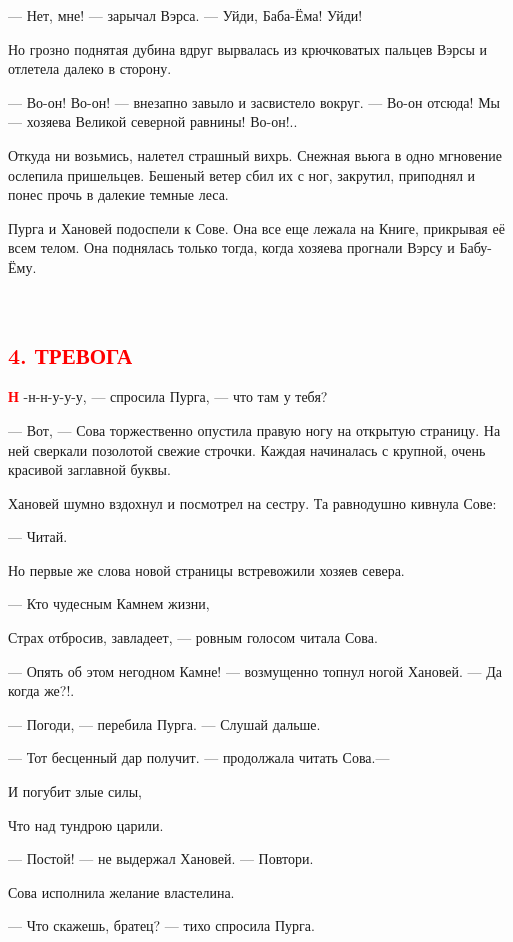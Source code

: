 \documentclass[oneside,final,14pt]{extreport}
\begin{document}
	— Нет, мне! — зарычал Вэрса. — Уйди, Баба-Ёма! Уйди!
	
	Но грозно поднятая дубина вдруг вырвалась из крючковатых пальцев Вэрсы и отлетела далеко в сторону.
	
	— Во-он! Во-он! — внезапно завыло и засвистело вокруг. — Во-он отсюда! Мы — хозяева Великой северной равнины! Во-он!..
	
	Откуда ни возьмись, налетел страшный вихрь. Снежная вьюга в одно мгновение ослепила пришельцев. Бешеный ветер сбил их с ног, закрутил, приподнял и понес прочь в далекие темные леса.
	
	Пурга и Хановей подоспели к Сове. Она все еще лежала на Книге, прикрывая её всем телом. Она поднялась только тогда, когда хозяева прогнали Вэрсу и Бабу-Ёму.
	
	\
	{%
		\centering
		\subsection*{\textcolor{red}{4. ТРЕВОГА}}
	}
	
	\lettrine[findent=0pt]{\textbf{\textcolor{red}{Н}}}{} -н-н-у-у-у, — спросила Пурга, — что там у тебя?
	
\qquad   	— Вот, — Сова торжественно опустила правую ногу на открытую страницу. На ней сверкали позолотой свежие строчки. Каждая начиналась с крупной, очень красивой заглавной буквы.
	
	Хановей шумно вздохнул и посмотрел на сестру. Та равнодушно кивнула Сове:
	
	— Читай.
	
	Но первые же слова новой страницы встревожили хозяев севера.
	
	— Кто чудесным Камнем жизни,
	
	Страх отбросив, завладеет, — ровным голосом читала Сова.
	
	— Опять об этом негодном Камне! — возмущенно топнул ногой Хановей. — Да когда же?!.
	
	— Погоди, — перебила Пурга. — Слушай дальше.
	
	— Тот бесценный дар получит. — продолжала читать Сова.—
	
	И погубит злые силы,
	
	Что над тундрою царили.
	
	— Постой! — не выдержал Хановей. — Повтори.
	
	Сова исполнила желание властелина.
	
	— Что скажешь, братец? — тихо спросила Пурга.
	
\end{document}

